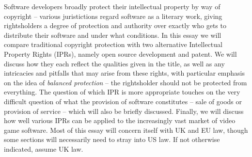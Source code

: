 Software developers broadly protect their intellectual property by way of copyright%
 -- various juristictions regard software as a literary work, %
giving rightsholders a degree of protection and authority over exactly who gets to distribute their software and under what conditions. In this essay we will compare traditional copyright protection with two alternative Intellectual Property Rights (IPRs), namely open source development and patent. We will discuss how they each reflect the qualities given in the title, as well as any intricacies and pitfalls that may arise from these rights, with particular emphasis on the idea of \emph{balanced protection} -- the rightsholder should not be protected from everything. The question of which IPR is more appropriate touches on the very difficult question of what the provision of software constitutes -- sale of goods or provision of service -- which will also be briefly discussed. Finally, we will discuss how well various IPRs can be applied to the increasingly vast market of video game software. Most of this essay will concern itself with UK and EU law, though some sections will necessarily need to stray into US law. If not otherwise indicated, assume UK law.